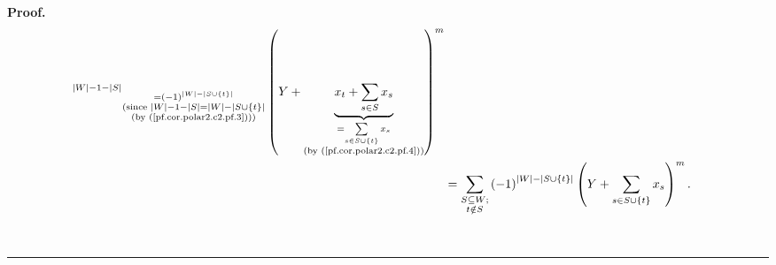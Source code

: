 \documentclass[numbers=enddot,12pt,final,onecolumn,notitlepage]{scrartcl}%
\theoremstyle{definition}
\newenvironment{proof}[1][Proof]{\noindent\textbf{#1.} }{\ \rule{0.5em}{0.5em}}
\let\sumnonlimits\sum
\renewcommand{\sum}{\sumnonlimits\limits}
\newenvironment{verlong}{}{}
\begin{document}
\begin{proof}
\begin{verlong}
\begin{align}
{^{\left\vert W\right\vert -1-\left\vert S\right\vert }}_{\substack{=\left(
-1\right)  ^{\left\vert W\right\vert -\left\vert S\cup\left\{  t\right\}
\right\vert }\\\text{(since }\left\vert W\right\vert -1-\left\vert
S\right\vert =\left\vert W\right\vert -\left\vert S\cup\left\{  t\right\}
\right\vert \\\text{(by (\ref{pf.cor.polar2.c2.pf.3})))}}}\left(
Y+\underbrace{x_{t}+\sum_{s\in S}x_{s}}_{\substack{=\sum_{s\in S\cup\left\{
t\right\}  }x_{s}\\\text{(by (\ref{pf.cor.polar2.c2.pf.4}))}}}\right)
^{m}\nonumber\\
&  =\sum_{\substack{S\subseteq W;\\t\notin S}}\left(  -1\right)  ^{\left\vert
W\right\vert -\left\vert S\cup\left\{  t\right\}  \right\vert }\left(
Y+\sum_{s\in S\cup\left\{  t\right\}  }x_{s}\right)  ^{m}.
\label{pf.cor.polar2.c2.pf.5}%
\end{align}



\end{verlong}
\end{proof}
\end{document}
